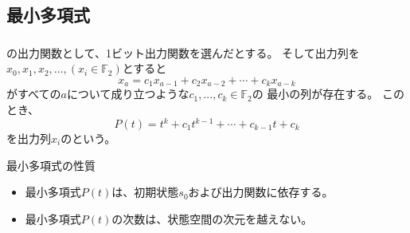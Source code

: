 \documentclass[cjk, dvips, handout, trans, xcolor=dvipsnames]{beamer}
\def\F2{{\mathbb F}_2}
\begin{document}
\subsection{最小多項式}
\begin{frame}[t]
  \frametitle{\insertsubsection}
  \FLPRNG の出力関数として、1ビット出力関数を選んだとする。
  そして出力列を$x_0, x_1, x_2, ..., (x_i \in \F2)$とすると%
  \[
  x_a = c_1x_{a-1} + c_{2}x_{a-2} + \cdots + c_{k}x_{a-k}
  \]
  がすべての$a$について成り立つような$c_1,...,c_k \in \F2$の
  最小の列が存在する。
  このとき、
  \[
  P(t) = t^k + c_1t^{k-1} + \cdots + c_{k-1}t + c_{k}
  \]
  を出力列$x_i$のという。

  \pause
  \begin{block}{最小多項式の性質}
    \begin{itemize}
    \item 最小多項式$P(t)$は、初期状態$s_0$および出力関数に依存する。
    \item 最小多項式$P(t)$の次数は、状態空間の次元を越えない。
    \end{itemize}
  \end{block}

\end{frame}
\end{document}
